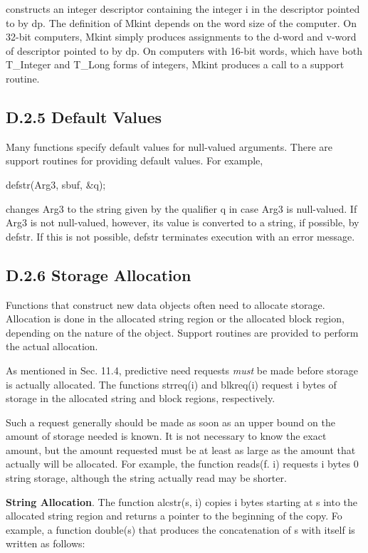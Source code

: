constructs an integer descriptor containing the integer i in the
descriptor pointed to by dp. The definition of Mkint depends on the
word size of the computer. On 32-bit computers, Mkint simply produces
assignments to the d-word and v-word of descriptor pointed to by
dp. On computers with 16-bit words, which have both T\_Integer and
T\_Long forms of integers, Mkint produces a call to a support routine.

\subsection{D.2.5 Default Values}

Many functions specify default values for null-valued arguments. There
are support routines for providing default values. For example,

{\ttfamily\mdseries
defstr(Arg3, sbuf, \&q);}

\noindent changes Arg3 to the string given by the qualifier q in case
Arg3 is null-valued. If Arg3 is not null-valued, however, its value is
converted to a string, if possible, by defstr. If this is not
possible, defstr terminates execution with an error message.

\subsection{D.2.6 Storage Allocation}

Functions that construct new data objects often need to allocate
storage. Allocation is done in the allocated string region or the
allocated block region, depending on the nature of the object. Support
routines are provided to perform the actual allocation.

As mentioned in Sec. 11.4, predictive need requests \textit{must} be
made before storage is actually allocated. The functions strreq(i) and
blkreq(i) request i bytes of storage in the allocated string and block
regions, respectively.

Such a request generally should be made as soon as an upper bound on
the amount of storage needed is known. It is not necessary to know the
exact amount, but the amount requested must be at least as large as
the amount that actually will be allocated. For example, the function
reads(f. i) requests i bytes 0 string storage, although the string
actually read may be shorter.

\textbf{String Allocation}. The function alcstr(s, i) copies i bytes
starting at s into the allocated string region and returns a pointer
to the beginning of the copy. Fo example, a function double(s) that
produces the concatenation of s with itself is written as follows:

